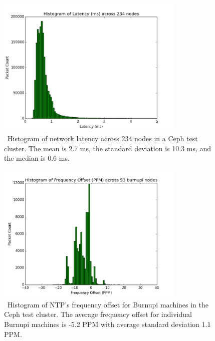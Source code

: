 \begin{figure}[h]
  \centering
  \caption{~Histogram of network latency across 234 nodes in a Ceph test cluster. The mean is 2.7 ms, the 
  standard deviation is 10.3 ms, and the median is 0.6 ms.} 
  \label{fig:latency-hist}
  \includegraphics[width=0.8\textwidth]{latency-hist.png}
\end{figure}

\begin{figure}[!htbp]
  \centering
  \caption{~Histogram of NTP's frequency offset for Burnupi machines in the Ceph test cluster.
  The average frequency
  offset for individual Burnupi machines is -5.2 PPM with average
  standard deviation 1.1 PPM.}
  \label{fig:burnupi-hist}
  \includegraphics[width=0.8\textwidth]{burnupi-freq-offset.png}
\end{figure}

